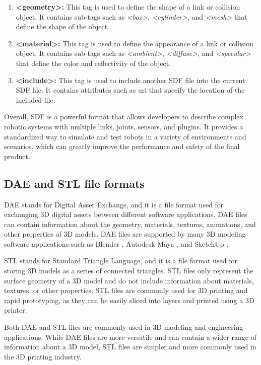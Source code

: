 \documentclass[12pt,oneside]{article}
\begin{document}
\begin{enumerate}
\item \textbf{<geometry>:} This tag is used to define the shape of a link or collision object. It contains sub-tags such as \textit{<box>}, \textit{<cylinder>}, and \textit{<mesh>} that define the shape of the object.
\item \textbf{<material>: }This tag is used to define the appearance of a link or collision object. It contains sub-tags such as \textit{<ambient>}, \textit{<diffuse>}, and \textit{<specular>} that define the color and reflectivity of the object.
\item \textbf{<include>: }This tag is used to include another SDF file into the current SDF file. It contains attributes such as uri that specify the location of the included file.
\end{enumerate}

Overall, SDF is a powerful format that allows developers to describe complex robotic systems with multiple links, joints, sensors, and plugins. It provides a standardized way to simulate and test robots in a variety of environments and scenarios, which can greatly improve the performance and safety of the final product.

\subsection{DAE and STL file formats }\label{dae_stl}
DAE stands for Digital Asset Exchange, and it is a file format used for exchanging 3D digital assets between different software applications. DAE files can contain information about the geometry, materials, textures, animations, and other properties of 3D models. DAE files are supported by many 3D modeling software applications such as Blender \cite{Blender}, Autodesk Maya \cite{Maya}, and SketchUp \cite{SketchUp}.

STL stands for Standard Triangle Language, and it is a file format used for storing 3D models as a series of connected triangles. STL files only represent the surface geometry of a 3D model and do not include information about materials, textures, or other properties. STL files are commonly used for 3D printing and rapid prototyping, as they can be easily sliced into layers and printed using a 3D printer.

Both DAE and STL files are commonly used in 3D modeling and engineering applications. While DAE files are more versatile and can contain a wider range of information about a 3D model, STL files are simpler and more commonly used in the 3D printing industry.
\end{document}
